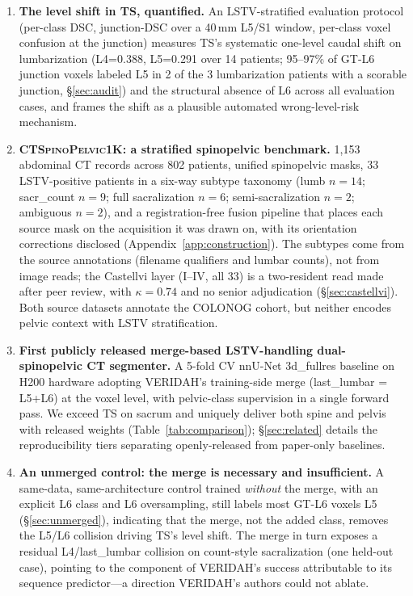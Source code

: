 \documentclass{article}
\newcommand{\dataset}{\textsc{CTSpinoPelvic1K}}
\newcommand{\sota}{TS}
\newcommand{\VERIDAH}{VERIDAH}
\begin{document}
\begin{enumerate}
\item[(i)] \textbf{The level shift in \sota{},
  quantified.} An LSTV-stratified evaluation protocol
  (per-class DSC, junction-DSC over a 40\,mm L5/S1
  window, per-class voxel confusion at the junction)
  measures \sota{}'s systematic one-level caudal shift
  on lumbarization (L4=0.388, L5=0.291 over 14 patients;
  95--97\% of GT-L6 junction voxels labeled L5 in 2 of
  the 3 lumbarization patients with a scorable junction,
  \S\ref{sec:audit}) and the structural absence of
  L6 across all evaluation cases, and frames the shift
  as a plausible automated wrong-level-risk mechanism.
\item[(ii)] \textbf{\dataset{}: a stratified spinopelvic
  benchmark.} 1{,}153 abdominal CT records across 802
  patients, unified spinopelvic masks, 33 LSTV-positive
  patients in a six-way subtype taxonomy
  (lumb $n{=}14$; sacr\_count $n{=}9$; full sacralization
  $n{=}6$; semi-sacralization $n{=}2$; ambiguous $n{=}2$),
  and a registration-free fusion pipeline that places each
  source mask on the acquisition it was drawn on, with its
  orientation corrections disclosed
  (Appendix~\ref{app:construction}). The subtypes
  come from the source annotations (filename qualifiers
  and lumbar counts), not from image reads; the Castellvi
  layer (I--IV, all 33) is a two-resident read made after
  peer review, with $\kappa{=}0.74$ and no senior
  adjudication (\S\ref{sec:castellvi}). Both source datasets
  annotate the COLONOG cohort, but neither encodes pelvic
  context with LSTV stratification.
\item[(iii)] \textbf{First publicly released merge-based
  LSTV-handling dual-spinopelvic CT segmenter.} A 5-fold CV nnU-Net
  3d\_fullres baseline on H200 hardware adopting
  \VERIDAH{}'s training-side merge
  (last\_lumbar = L5+L6) at the voxel level, with
  pelvic-class supervision in a single forward pass.
  We exceed \sota{} on sacrum and uniquely deliver both
  spine and pelvis with released weights
  (Table~\ref{tab:comparison}); \S\ref{sec:related}
  details the reproducibility tiers separating
  openly-released from paper-only baselines.
\item[(iv)] \textbf{An unmerged control: the merge is
  necessary and insufficient.} A same-data,
  same-architecture control trained \emph{without} the
  merge, with an explicit L6 class and L6 oversampling,
  still labels most GT-L6 voxels L5
  (\S\ref{sec:unmerged}), indicating that the merge, not
  the added class, removes the L5/L6 collision
  driving \sota{}'s level shift. The merge in turn exposes
  a residual L4/last\_lumbar collision on count-style
  sacralization (one held-out case), pointing to the
  component of \VERIDAH{}'s success attributable to its
  sequence predictor---a direction \VERIDAH{}'s authors
  could not ablate.
\end{enumerate}
\end{document}
